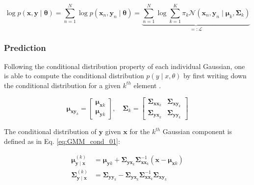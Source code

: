 \documentclass{achemso}
\begin{document}
\begin{equation} \label{eq:logLL_2}
\log p(\boldsymbol{x},\boldsymbol{y} \mid \boldsymbol{\theta})=\sum_{n=1}^N \log p\left(\boldsymbol{x}_n, \boldsymbol{y}_n \mid \boldsymbol{\theta}\right)=\underbrace{\sum_{n=1}^N \log \sum_{k=1}^K \pi_k \mathcal{N}\left(\boldsymbol{x}_n, \boldsymbol{y}_n \mid \boldsymbol{\mu}_k, \boldsymbol{\Sigma}_k\right)}_{=: \mathcal{L}}
\end{equation}
\subsubsection{Prediction}

Following the conditional distribution property of each individual Gaussian, one is able to compute the conditional distribution \(p(y \mid x,\theta)\) by first writing down the conditional distribution for a given \(k^{th}\) element \cite{Fabisch2021}.

\begin{equation}
\boldsymbol{\mu}_{\boldsymbol{xy}_k} =
\begin{bmatrix}
\boldsymbol{\mu}_{\boldsymbol{x}k} \\
\boldsymbol{\mu}_{\boldsymbol{y}k}
\end{bmatrix},
\quad
\boldsymbol{\Sigma}_{k} =
\begin{bmatrix}
\boldsymbol{\Sigma}_{\boldsymbol{xx}_k} & \boldsymbol{\Sigma}_{\boldsymbol{xy}_k} \\
\boldsymbol{\Sigma}_{\boldsymbol{yx}_k} & \boldsymbol{\Sigma}_{\boldsymbol{yy}_k}
\end{bmatrix}
\end{equation}

\noindent The conditional distribution of \(\boldsymbol{y}\) given \(\boldsymbol{x}\) for the \(k^{th}\) Gaussian component is defined as in Eq. \ref{eq:GMM_cond_01}:

\begin{equation} \label{eq:GMM_cond_01}
\begin{aligned}
\boldsymbol{\mu}_{\boldsymbol{y} \mid \boldsymbol{x}}^{(k)} &= \boldsymbol{\mu}_{\boldsymbol{y}k} + \boldsymbol{\Sigma}_{\boldsymbol{yx}_k} \boldsymbol{\Sigma}_{\boldsymbol{xx}_k}^{-1}(\boldsymbol{x} - \boldsymbol{\mu}_{\boldsymbol{x}k}) \\
\boldsymbol{\Sigma}_{\boldsymbol{y} \mid \boldsymbol{x}}^{(k)} &= \boldsymbol{\Sigma}_{\boldsymbol{yy}_k} - \boldsymbol{\Sigma}_{\boldsymbol{yx}_k} \boldsymbol{\Sigma}_{\boldsymbol{xx}_k}^{-1} \boldsymbol{\Sigma}_{\boldsymbol{xy}_k}
\end{aligned}
\end{equation}
\end{document}
